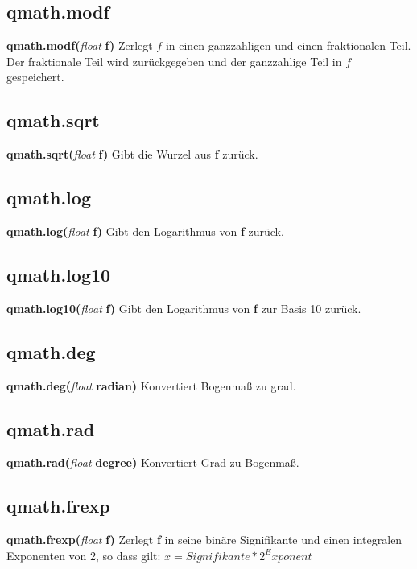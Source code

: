 \documentclass[11pt,a4paper]{book}
\begin{document}
\subsection{qmath.modf}
\label{qm-modf}
\textbf{qmath.modf(}\textit{float}\textbf{ f)}
\newline
Zerlegt \begin{math}f\end{math} in einen ganzzahligen und einen fraktionalen Teil. Der fraktionale Teil wird zurückgegeben und der ganzzahlige Teil in \begin{math}f\end{math} gespeichert.
\subsection{qmath.sqrt}
\label{qm-sqrt}
\textbf{qmath.sqrt(}\textit{float}\textbf{ f)}
\newline
Gibt die Wurzel aus \textbf{f} zurück.
\subsection{qmath.log}
\label{qm-log}
\textbf{qmath.log(}\textit{float}\textbf{ f)}
\newline
Gibt den Logarithmus von \textbf{f} zurück.
\subsection{qmath.log10}
\label{qm-log10}
\textbf{qmath.log10(}\textit{float}\textbf{ f)}
\newline
Gibt den Logarithmus von \textbf{f} zur Basis 10 zurück.
\subsection{qmath.deg}
\label{qm-deg}
\textbf{qmath.deg(}\textit{float}\textbf{ radian)}
\newline
Konvertiert Bogenmaß zu grad.
\subsection{qmath.rad}
\label{qm-rad}
\textbf{qmath.rad(}\textit{float}\textbf{ degree)}
\newline
Konvertiert Grad zu Bogenmaß.
\subsection{qmath.frexp}
\label{qm-frexp}
\textbf{qmath.frexp(}\textit{float}\textbf{ f)}
\newline
Zerlegt \textbf{f} in seine binäre Signifikante und einen integralen Exponenten von 2, so dass gilt:
\newline
\begin{math}x=Signifikante*2^Exponent\end{math}
\end{document}
